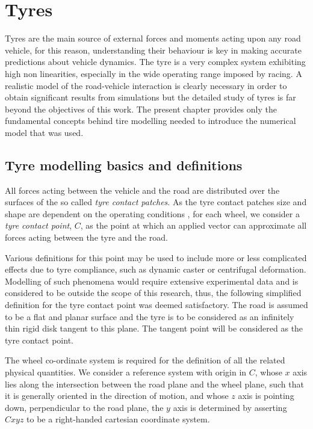 \chapter{Tyres}
\label{chap:tyres}
Tyres are the main source of external forces and moments acting upon any road vehicle, for this reason, understanding their behaviour is key in making accurate predictions about vehicle dynamics. The tyre is a very complex system exhibiting high non linearities, especially in the wide operating range imposed by racing.
A realistic model of the road-vehicle interaction is clearly necessary in order to obtain significant results from simulations but the detailed study of tyres is far beyond the objectives of this work.
The present chapter provides only the fundamental concepts behind tire modelling needed to introduce the numerical model that was used.
\section{Tyre modelling basics and definitions}
\label{sec:tyrebasics}
All forces acting between the vehicle and the road are distributed over the surfaces of the so called \textit{tyre contact patches}. As the tyre contact patches size and shape are dependent on the operating conditions , for each wheel, we consider a \textit{tyre contact point}, $C$, as the point at which an applied vector can approximate all forces acting between the tyre and the road.

Various definitions for this point may be used to include more or less complicated effects due to tyre compliance, such as dynamic caster or centrifugal deformation.
Modelling of such phenomena would require extensive experimental data and is considered to be outside the scope of this research, thus, the following simplified definition for the tyre contact point was deemed satisfactory. The road is assumed to be a flat and planar surface and the tyre is to be considered as an infinitely thin rigid disk tangent to this plane.  The tangent point will be considered as the tyre contact point.

The wheel co-ordinate system is required for the definition of all the related physical quantities.
We consider a reference system  with origin in $C$, whose $x$ axis lies along the intersection between the road plane and the wheel plane, such that it is generally oriented in the direction of motion, and whose $z$ axis is pointing down, perpendicular to the road plane, the $y$ axis is determined by asserting $Cxyz$ to be a right-handed cartesian coordinate system.

